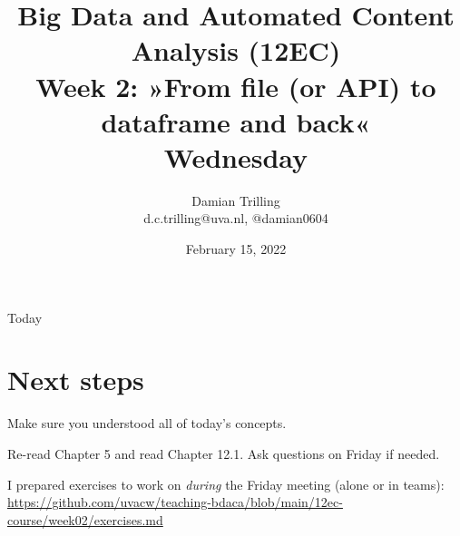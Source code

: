 

\graphicspath{{../../resources/img/}}




\title[Big Data and Automated Content Analysis]{\textbf{Big Data and Automated Content Analysis (12EC)} 
\\Week 2: »From file (or API) to dataframe and back«
\\Wednesday}
\author[Damian Trilling]{Damian Trilling\\ \footnotesize{d.c.trilling@uva.nl, @damian0604 \\}}
\date{February 15, 2022}


\begin{frame}{}
	\titlepage
\end{frame}

\begin{frame}{Today}
	\tableofcontents
\end{frame}



	










\section{Next steps}




\begin{frame}[standout]
Make sure you understood all of today's concepts.

Re-read Chapter 5 and read Chapter 12.1. Ask questions on Friday if needed.

I prepared exercises to work on \emph{during} the Friday meeting (alone or in teams):
\large{\url{https://github.com/uvacw/teaching-bdaca/blob/main/12ec-course/week02/exercises.md}}
\end{frame}





\begin{frame}
	\printbibliography
\end{frame}





